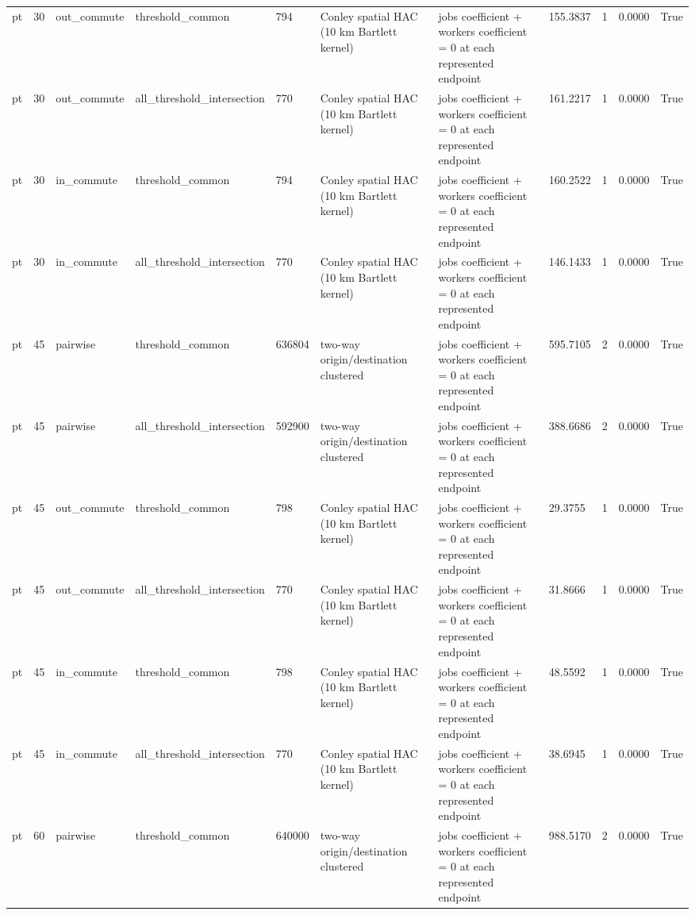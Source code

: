 \begin{table}[htbp]
\begin{tabular}{lllllllllll}
pt & 30 & out\_commute & threshold\_common & 794 & Conley spatial HAC (10 km Bartlett kernel) & jobs coefficient + workers coefficient = 0 at each represented endpoint & 155.3837 & 1 & 0.0000 & True \\
pt & 30 & out\_commute & all\_threshold\_intersection & 770 & Conley spatial HAC (10 km Bartlett kernel) & jobs coefficient + workers coefficient = 0 at each represented endpoint & 161.2217 & 1 & 0.0000 & True \\
pt & 30 & in\_commute & threshold\_common & 794 & Conley spatial HAC (10 km Bartlett kernel) & jobs coefficient + workers coefficient = 0 at each represented endpoint & 160.2522 & 1 & 0.0000 & True \\
pt & 30 & in\_commute & all\_threshold\_intersection & 770 & Conley spatial HAC (10 km Bartlett kernel) & jobs coefficient + workers coefficient = 0 at each represented endpoint & 146.1433 & 1 & 0.0000 & True \\
pt & 45 & pairwise & threshold\_common & 636804 & two-way origin/destination clustered & jobs coefficient + workers coefficient = 0 at each represented endpoint & 595.7105 & 2 & 0.0000 & True \\
pt & 45 & pairwise & all\_threshold\_intersection & 592900 & two-way origin/destination clustered & jobs coefficient + workers coefficient = 0 at each represented endpoint & 388.6686 & 2 & 0.0000 & True \\
pt & 45 & out\_commute & threshold\_common & 798 & Conley spatial HAC (10 km Bartlett kernel) & jobs coefficient + workers coefficient = 0 at each represented endpoint & 29.3755 & 1 & 0.0000 & True \\
pt & 45 & out\_commute & all\_threshold\_intersection & 770 & Conley spatial HAC (10 km Bartlett kernel) & jobs coefficient + workers coefficient = 0 at each represented endpoint & 31.8666 & 1 & 0.0000 & True \\
pt & 45 & in\_commute & threshold\_common & 798 & Conley spatial HAC (10 km Bartlett kernel) & jobs coefficient + workers coefficient = 0 at each represented endpoint & 48.5592 & 1 & 0.0000 & True \\
pt & 45 & in\_commute & all\_threshold\_intersection & 770 & Conley spatial HAC (10 km Bartlett kernel) & jobs coefficient + workers coefficient = 0 at each represented endpoint & 38.6945 & 1 & 0.0000 & True \\
pt & 60 & pairwise & threshold\_common & 640000 & two-way origin/destination clustered & jobs coefficient + workers coefficient = 0 at each represented endpoint & 988.5170 & 2 & 0.0000 & True \\

\end{tabular}
\end{table}
